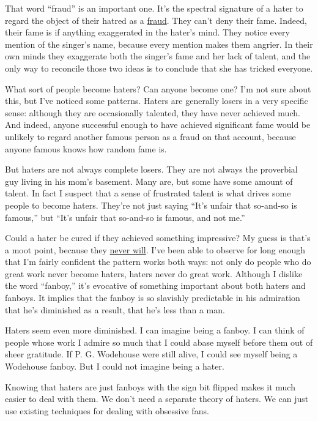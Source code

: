 That word ``fraud'' is an important one. It's the spectral signature of
a hater to regard the object of their hatred as a
\href{https://twitter.com/search?q=Musk\%20fraud&src=typed_query&f=live}{fraud}.
They can't deny their fame. Indeed, their fame is if anything
exaggerated in the hater's mind. They notice every mention of the
singer's name, because every mention makes them angrier. In their own
minds they exaggerate both the singer's fame and her lack of talent, and
the only way to reconcile those two ideas is to conclude that she has
tricked everyone.

What sort of people become haters? Can anyone become one? I'm not sure
about this, but I've noticed some patterns. Haters are generally losers
in a very specific sense: although they are occasionally talented, they
have never achieved much. And indeed, anyone successful enough to have
achieved significant fame would be unlikely to regard another famous
person as a fraud on that account, because anyone famous knows how
random fame is.

But haters are not always complete losers. They are not always the
proverbial guy living in his mom's basement. Many are, but some have
some amount of talent. In fact I suspect that a sense of frustrated
talent is what drives some people to become haters. They're not just
saying ``It's unfair that so-and-so is famous,'' but ``It's unfair that
so-and-so is famous, and not me.''

Could a hater be cured if they achieved something impressive? My guess
is that's a moot point, because they \href{mean.html}{never will}. I've
been able to observe for long enough that I'm fairly confident the
pattern works both ways: not only do people who do great work never
become haters, haters never do great work. Although I dislike the word
``fanboy,'' it's evocative of something important about both haters and
fanboys. It implies that the fanboy is so slavishly predictable in his
admiration that he's diminished as a result, that he's less than a man.

Haters seem even more diminished. I can imagine being a fanboy. I can
think of people whose work I admire so much that I could abase myself
before them out of sheer gratitude. If P. G. Wodehouse were still alive,
I could see myself being a Wodehouse fanboy. But I could not imagine
being a hater.

Knowing that haters are just fanboys with the sign bit flipped makes it
much easier to deal with them. We don't need a separate theory of
haters. We can just use existing techniques for dealing with obsessive
fans.

